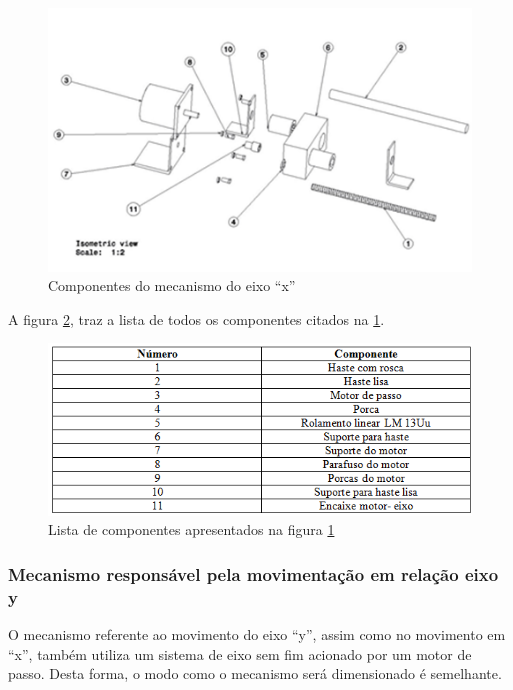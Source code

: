 \begin{figure}[H]
		\centering
			\includegraphics[scale=1.0]{figuras/eixox3.png}
		\caption{Componentes do mecanismo do eixo “x”}
		\label{eixox3}
\end{figure}

A figura \ref{eixox31}, traz a lista de todos os componentes citados na \ref{eixox3}.

\begin{figure}[H]
		\centering
			\includegraphics[scale=1.0]{figuras/eixox31.png}
		\caption{Lista de componentes apresentados na figura \ref{eixox3}}
		\label{eixox31}
\end{figure}

\subsubsection[Mecanismo responsável pela movimentação em relação eixo y]{Mecanismo responsável pela movimentação em relação eixo y}

O mecanismo referente ao movimento do eixo “y”, assim como no movimento em “x”, também utiliza um sistema de eixo sem fim acionado por um motor de passo. Desta forma, o modo como o mecanismo será dimensionado é semelhante.

